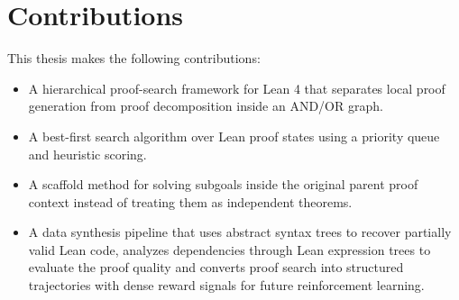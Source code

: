 \section{Contributions}

This thesis makes the following contributions:

\begin{itemize}
    \item A hierarchical proof-search framework for Lean 4 that separates local proof generation from proof decomposition inside an AND/OR graph.

    \item A best-first search algorithm over Lean proof states using a priority queue and heuristic scoring.
    
    \item A scaffold method for solving subgoals inside the original parent proof context instead of treating them as independent theorems.
    
    \item A data synthesis pipeline that uses abstract syntax trees to recover partially valid Lean code, analyzes dependencies through Lean expression trees to evaluate the proof quality and converts proof search into structured trajectories with dense reward signals for future reinforcement learning.
\end{itemize}